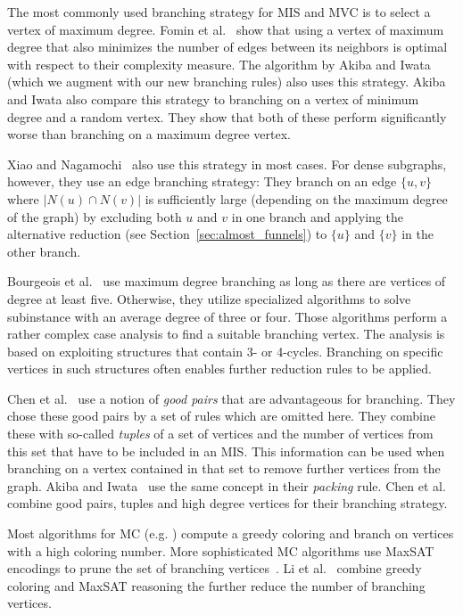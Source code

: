 \documentclass[a4paper,UKenglish,cleveref, autoref, thm-restate]{lipics-v2021}
\begin{document}
The most commonly used branching strategy for MIS and MVC is to select a vertex
of maximum degree. Fomin et al.~\cite{Fomin} show that using a vertex of maximum
degree that also minimizes the number of edges between its neighbors is optimal
with respect to their complexity measure. The algorithm by Akiba and Iwata~\cite{AkibaIwata}
(which we augment with our new branching rules) also uses this strategy. Akiba and Iwata also
compare this strategy to branching on a vertex of minimum degree and a random
vertex. They show that both of these perform significantly worse than branching
on a maximum degree vertex.

Xiao and Nagamochi~\cite{XiaoNagamochi} also use
this strategy in most cases. For dense subgraphs, however, they use an edge
branching strategy: They branch on an edge $\{u, v\}$ where $|N(u) \cap N(v)|$
is sufficiently large (depending on the maximum degree of the graph) by
excluding both $u$ and $v$ in one branch and applying the alternative reduction
(see Section~\ref{sec:almost_funnels}) to $\{u\}$ and $\{v\}$ in the other branch.

Bourgeois et al.~\cite{Bourgeois} use maximum degree branching as long as there are vertices of degree at least five. Otherwise, they utilize specialized algorithms to solve subinstance with an average degree of three or four. Those algorithms perform a rather complex case analysis to find a suitable branching vertex. The analysis is based on exploiting structures that contain 3- or 4-cycles. Branching on specific vertices in such structures often enables further reduction rules to be applied.

Chen et al.~\cite{ChenXiaKanj} use a notion of \emph{good pairs} that are advantageous
for branching. They chose these good pairs by a set of rules which are omitted
here. They combine these with so-called \emph{tuples} of a set of vertices and the
number of vertices from this set that have to be included in an MIS. This
information can be used when branching on a vertex
contained in that set to remove further vertices from the graph. Akiba and
Iwata~\cite{AkibaIwata} use the same concept in their \emph{packing} rule. Chen
et al. combine good pairs, tuples and high degree vertices for their branching strategy.

Most algorithms for MC (e.g. \cite{Color,DBLP:journals/ieicet/TomitaSHW13}) compute a
greedy coloring and branch on vertices with a high coloring number.
More sophisticated MC algorithms use MaxSAT encodings to prune the set of
branching vertices~\cite{LiFangXu,LiJiang,LiQuan}. Li et al.~\cite{LiMaxSat}
combine greedy coloring and MaxSAT reasoning the further reduce the number of
branching vertices.
\end{document}
